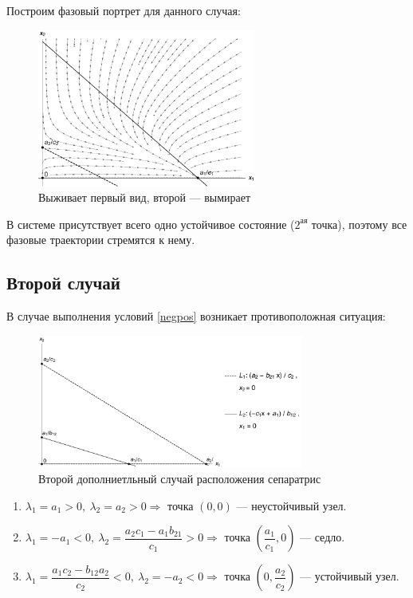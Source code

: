 \documentclass[12pt,a4paper]{article}
\begin{document}
    \pagebreak

    Построим фазовый портрет для данного случая:
    \begin{figure}[h]
        \centering
        \includegraphics[width=0.64\textwidth]{phase_3.pdf}
        \caption{Выживает первый вид, второй --- вымирает}
        \label{fig:phase_3}
    \end{figure}
    
    В системе присутствует всего одно устойчивое состояние ($2^{\text{ая}}$ точка), поэтому все фазовые траектории стремятся к нему.

    \subsection{Второй случай}
    В случае выполнения условий \eqref{negpos} возникает противоположная ситуация:
    \begin{figure}[h]
        \centering
        \includegraphics[width=0.78\textwidth]{sep_4.pdf}
        \caption{Второй дополниетльный случай расположения сепаратрис}
        \label{fig:sep_4}
    \end{figure}

    \begin{enumerate}
        \setlength\itemsep{0.5em}
        \item $ \lambda_1 = a_1 > 0,\ \lambda_2 = a_2 > 0 \Rightarrow $ точка $ (0, 0) $ --- неустойчивый узел.
    
        \item $ \lambda_1 = -a_1 < 0,\ \lambda_2 = \dfrac{a_2 c_1 - a_1 b_{21}}{c_1} > 0 \Rightarrow $ точка $ \left( \dfrac{a_1}{c_1}, 0 \right) $ --- седло.
        
        \item  $ \lambda_1 = \dfrac{a_1 c_2 - b_{12} a_2}{c_2} < 0,\ \lambda_2 = -a_2 < 0 \Rightarrow $ точка $ \left( 0, \dfrac{a_2}{c_2} \right) $ --- устойчивый узел.
    \end{enumerate}
\end{document}

